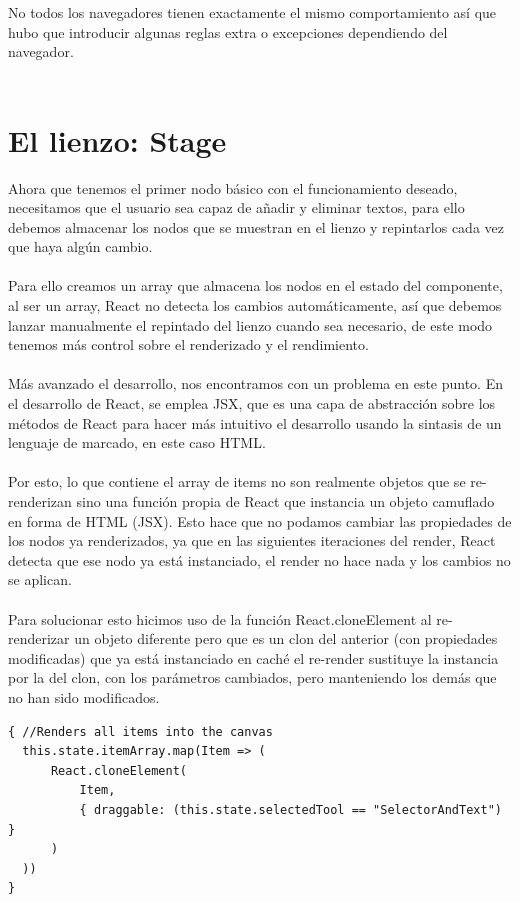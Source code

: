 No todos los navegadores tienen exactamente el mismo comportamiento así que hubo que 
introducir algunas reglas extra o excepciones dependiendo del navegador. 
\\\\

\section{El lienzo: Stage}

Ahora que tenemos el primer nodo básico con el funcionamiento deseado, necesitamos que
el usuario sea capaz de añadir y eliminar textos, para ello debemos almacenar los 
nodos que se muestran en el lienzo y repintarlos cada vez que haya algún cambio.
\\\\
Para ello creamos un array que almacena los nodos en el estado del componente, al ser 
un array, React no detecta los cambios automáticamente, así que debemos lanzar manualmente
el repintado del lienzo cuando sea necesario, de este modo tenemos más control sobre 
el renderizado y el rendimiento.
\\\\
Más avanzado el desarrollo, nos encontramos con un problema en este punto. En el desarrollo
de React, se emplea JSX\cite{JSX}, que es una capa de abstracción sobre los métodos de React 
para hacer más intuitivo el desarrollo usando la sintasis de un lenguaje de marcado,
en este caso HTML.
\\\\
Por esto, lo que contiene el array de items no son realmente objetos que se re-renderizan
sino una función propia de React que instancia un objeto camuflado en forma de HTML (JSX\cite{JSX}).
Esto hace que no podamos cambiar las propiedades de los nodos ya renderizados, ya que
en las siguientes iteraciones del render, React detecta que ese nodo ya está instanciado,
el render no hace nada y los cambios no se aplican. 
\\\\
Para solucionar esto hicimos uso de la función React.cloneElement al re-renderizar
un objeto diferente pero que es un clon del anterior (con propiedades modificadas)
que ya está instanciado en caché el re-render sustituye la instancia por la del clon,
con los parámetros cambiados, pero manteniendo los demás que no han sido modificados.

\begin{lstlisting}[caption={Render del array de nodos}]
{ //Renders all items into the canvas
  this.state.itemArray.map(Item => (
      React.cloneElement(
          Item,
          { draggable: (this.state.selectedTool == "SelectorAndText") }
      )
  ))
}
\end{lstlisting}

